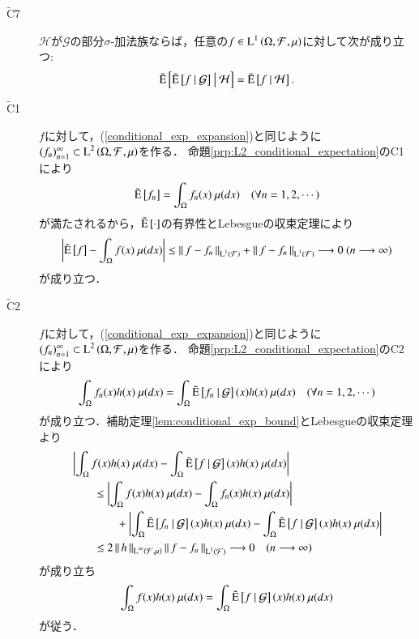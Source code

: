 \begin{screen}
\begin{prp}[拡張条件付き期待値の性質]
\begin{description}
			\item[$\tilde{\mathrm{C}}$7]	$\mathcal{H}$が$\mathcal{G}$の部分$\sigma$-加法族ならば，任意の$f \in \operatorname{L}^{1} \left(\Omega, \mathcal{F},\mu\right)$に対して次が成り立つ:
				\begin{align}
					\tilde{\operatorname{E}} \left[ \tilde{\operatorname{E}} \left[ f \ \middle|\ \mathcal{G} \right] \ \middle|\ \mathcal{H} \right] = \tilde{\operatorname{E}} \left[ f \ \middle|\ \mathcal{H} \right].
				\end{align}
		\end{description}
		\label{prp:properties_of_expanded_conditional_expectation}
		\end{prp}
	\end{screen}
	
	\begin{prf}\mbox{}
		\begin{description}
			\item[$\tilde{\mathrm{C}}$1]
				$f$に対して，(\ref{conditional_exp_expansion})と同じように$(f_n)_{n=1}^{\infty} \subset \operatorname{L}^{2} \left(\Omega,\mathcal{F},\mu\right)$を作る．
				命題\ref{prp:L2_conditional_expectation}のC1により
				\begin{align}
					\tilde{\operatorname{E}} \left[ f_n \right] = \int_{\Omega} f_n(x)\ \mu(dx) \quad (\forall n = 1,2,\cdots)
				\end{align}
				が満たされるから，$\tilde{\operatorname{E}} \left[ \cdot \right]$の有界性とLebesgueの収束定理により
				\begin{align}
					\left| \tilde{\operatorname{E}} \left[ f \right] - \int_{\Omega} f(x)\ \mu(dx) \right|
					\leq \left\|\, f - f_n\, \right\|_{\operatorname{L}^{1} \left(\mathcal{F}\right)} + \left\|\, f - f_n\, \right\|_{\operatorname{L}^{1} \left(\mathcal{F}\right)}
					\longrightarrow 0\ (n \longrightarrow \infty)
				\end{align}
				が成り立つ．
				
			\item[$\tilde{\mathrm{C}}$2]	
				$f$に対して，(\ref{conditional_exp_expansion})と同じように$(f_n)_{n=1}^{\infty} \subset \operatorname{L}^{2} \left(\Omega,\mathcal{F},\mu\right)$を作る．
				命題\ref{prp:L2_conditional_expectation}のC2により
				\begin{align}
					\int_{\Omega} f_n(x)h(x)\ \mu(dx) = \int_{\Omega} \tilde{\operatorname{E}} \left[ f_n \ \middle|\ \mathcal{G} \right](x)h(x)\ \mu(dx)
					\quad (\forall n = 1,2,\cdots)
				\end{align}
				が成り立つ．補助定理\ref{lem:conditional_exp_bound}とLebesgueの収束定理より
				\begin{align}
					&\left| \int_{\Omega} f(x)h(x)\ \mu(dx) - \int_{\Omega} \tcexp{f}{\mathcal{G}}(x)h(x)\ \mu(dx) \right| \\
					&\qquad \leq \left| \int_{\Omega} f(x)h(x)\ \mu(dx) - \int_{\Omega} f_n(x)h(x)\ \mu(dx) \right| \\
						&\qquad \qquad+ \left| \int_{\Omega} \tcexp{f_n}{\mathcal{G}}(x)h(x)\ \mu(dx) - \int_{\Omega} \tcexp{f}{\mathcal{G}}(x)h(x)\ \mu(dx) \right| \\
					&\qquad \leq 2 \Norm{h}{\Lp{\infty}{\mathcal{F},\mu}} \Norm{f - f_n}{\Lp{1}{\mathcal{F}}} 
					\longrightarrow 0 \quad (n \longrightarrow \infty)
				\end{align}
				が成り立ち
				\begin{align}
					\int_{\Omega} f(x)h(x)\ \mu(dx) = \int_{\Omega} \tilde{\operatorname{E}} \left[ f \ \middle|\ \mathcal{G} \right](x)h(x)\ \mu(dx)
				\end{align}
				が従う．
				

\end{description}
\end{prf}

